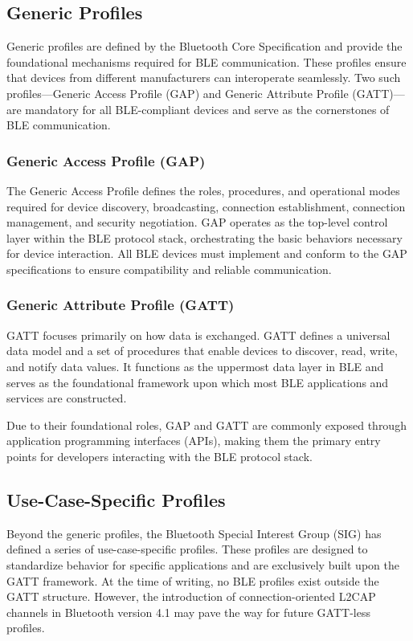 \subsection{Generic Profiles}

Generic profiles are defined by the Bluetooth Core Specification and provide the foundational mechanisms required for BLE communication. These profiles ensure that devices from different manufacturers can interoperate seamlessly. Two such profiles—Generic Access Profile (GAP) and Generic Attribute Profile (GATT)—are mandatory for all BLE-compliant devices and serve as the cornerstones of BLE communication.

\subsubsection{Generic Access Profile (GAP)}

The Generic Access Profile defines the roles, procedures, and operational modes required for device discovery, broadcasting, connection establishment, connection management, and security negotiation. GAP operates as the top-level control layer within the BLE protocol stack, orchestrating the basic behaviors necessary for device interaction. All BLE devices must implement and conform to the GAP specifications to ensure compatibility and reliable communication.

\subsubsection{Generic Attribute Profile (GATT)}

GATT focuses primarily on how data is exchanged. GATT defines a universal data model and a set of procedures that enable devices to discover, read, write, and notify data values. It functions as the uppermost data layer in BLE and serves as the foundational framework upon which most BLE applications and services are constructed.

Due to their foundational roles, GAP and GATT are commonly exposed through application programming interfaces (APIs), making them the primary entry points for developers interacting with the BLE protocol stack.

\subsection{Use-Case-Specific Profiles}

Beyond the generic profiles, the Bluetooth Special Interest Group (SIG) has defined a series of use-case-specific profiles. These profiles are designed to standardize behavior for specific applications and are exclusively built upon the GATT framework. At the time of writing, no BLE profiles exist outside the GATT structure. However, the introduction of connection-oriented L2CAP channels in Bluetooth version 4.1 may pave the way for future GATT-less profiles.

